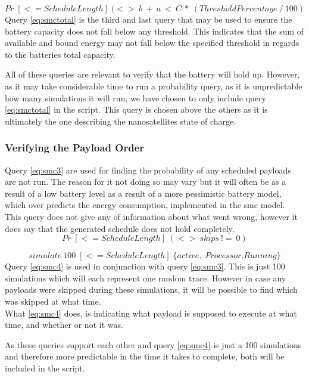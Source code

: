 \begin{equation} \label{eq:smctotal}
	Pr\; [<=ScheduleLength] \; (<>\; b\ +\ a\ <\ C\ *\ (ThresholdPercentage\ /\ 100)
\end{equation}
Query \ref{eq:smctotal} is the third and last query that may be used to ensure the battery capacity does not fall below any threshold. This indicates that the sum of available and bound energy may not fall below the specified threshold in regards to the batteries total capacity.

All of these queries are relevant to verify that the battery will hold up. However, as it may take considerable time to run a probability query, as it is unpredictable how many simulations it will run, we have chosen to only include query \ref{eq:smctotal} in the script. This query is chosen above the others as it is ultimately the one describing the nanosatellites state of charge.

\subsubsection*{Verifying the Payload Order}
Query \ref{eq:smc3} are used for finding the probability of any scheduled payloads are not run. The reason for it not doing so may vary but it will often be as a result of a low battery level as a result of a more pessimistic battery model, which over predicts the energy consumption, implemented in the \gls{smc} model.\\
This query does not give any of information about what went wrong, however it does say that the generated schedule does not hold completely.
\begin{equation} \label{eq:smc3}
Pr\; [<=ScheduleLength] \; (<> \ skips \ !=\ 0)
\end{equation}

\begin{equation} \label{eq:smc4}
	simulate\ 100 \; [<=ScheduleLength] \; \{active, \; Processor.Running\}
\end{equation}
Query \ref{eq:smc4} is used in conjunction with query \ref{eq:smc3}. This is just 100 simulations which will each represent one random trace. However in case any payloads were skipped during these simulations, it will be possible to find which was skipped at what time.\\
What \ref{eq:smc4} does, is indicating what payload is supposed to execute at what time, and whether or not it was.

As these queries support each other and query \ref{eq:smc4} is just a 100 simulations and therefore more predictable in the time it takes to complete, both will be included in the script.


